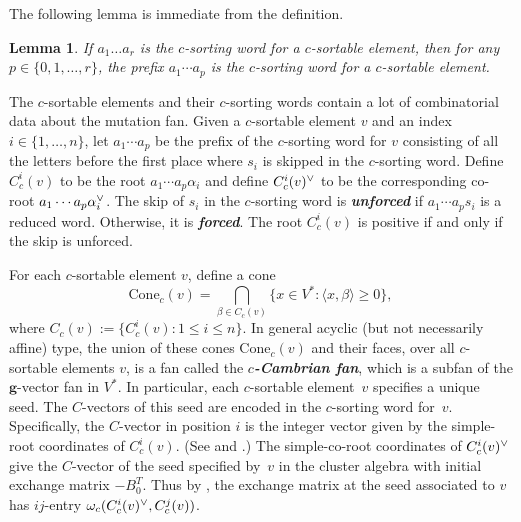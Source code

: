\documentclass[10pt]{article}
\newtheorem{lemma}[proposition]{Lemma}
\theoremstyle{definition}
\theoremstyle{remark}
\numberwithin{equation}{section}
\newcommand{\newword}[1]{\textbf{\emph{#1}}}
\newcommand{\set}[1]{{\lbrace #1 \rbrace}}
\newcommand{\br}[1]{{\langle #1 \rangle}}
\newcommand{\ck}{\spcheck}
\newcommand{\0}{{\mathbf{0}}}
\newcommand{\Cone}{\mathrm{Cone}}
\newcommand{\g}{\mathbf{g}}
\newcommand{\RSChar}{\Phi}
\newcommand{\RS}{\RSChar}
\begin{document}
The following lemma is immediate from the definition.
\begin{lemma}\label{any prefix}
If $a_1\ldots a_r$ is the $c$-sorting word for a $c$-sortable element, then for any $p\in\set{0,1,\ldots,r}$, the prefix $a_1\cdots a_p$ is the $c$-sorting word for a $c$-sortable element.
\end{lemma}


The $c$-sortable elements and their $c$-sorting words contain a lot of combinatorial data about the mutation fan.
Given a $c$-sortable element $v$ and an index $i\in\set{1,\ldots,n}$, let $a_1\cdots a_p$ be the prefix of the $c$-sorting word for $v$ consisting of all the letters before the first place where $s_i$ is skipped in the $c$-sorting word.
Define $C_c^i(v)$ to be the root $a_1\cdots a_p\alpha_i$ and define $C_c^i(v)\ck$ to be the corresponding co-root $a_1\cdots a_p\alpha\ck_i$.
The skip of $s_i$ in the $c$-sorting word is \newword{unforced} if $a_1\cdots a_ps_i$ is a reduced word.
Otherwise, it is \newword{forced}.
The root $C_c^i(v)$ is positive if and only if the skip is unforced.

For each $c$-sortable element $v$, define a cone  
\[\Cone_c(v)=\bigcap_{\beta \in C_c(v)}\set{x\in V^*:\br{x,\beta} \geq 0},\]
where $C_c(v):=\{C_c^i(v):1\le i\le n\}$.
In general acyclic (but not necessarily affine) type, the union of these cones $\Cone_c(v)$ and their faces, over all $c$-sortable elements $v$, is a fan called the \newword{$c$-Cambrian fan}, which is a subfan of the $\g$-vector fan in $V^*$.
In particular, each $c$-sortable element~$v$ specifies a unique seed.
The $C$-vectors of this seed are encoded in the $c$-sorting word for~$v$.
Specifically, the $C$-vector in position $i$ is the integer vector given by the simple-root coordinates of $C_c^i(v)$.
(See \cite[Therem~1.1]{framework} and \cite[Theorem~5.12]{framework}.)
The simple-co-root coordinates of $C_c^i(v)\ck$ give the $C$-vector of the seed specified by~$v$ in the cluster algebra with initial exchange matrix $-B_0^T$.
Thus by \cite[Theorem~1.1]{framework}, the exchange matrix at the seed associated to $v$ has $ij$-entry $\omega_c(C_c^i(v)\ck,C_c^j(v))$.
\end{document}
